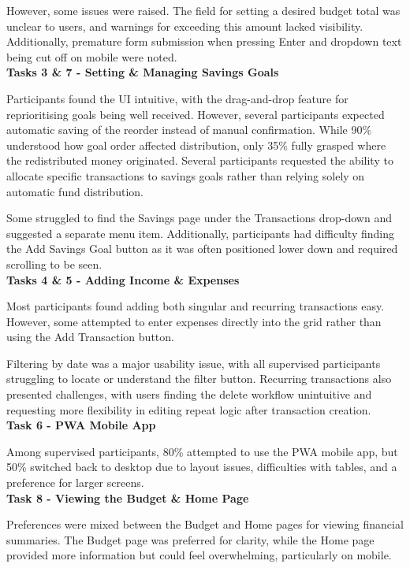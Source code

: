 \documentclass{l4proj}
\begin{document}
However, some issues were raised. The field for setting a desired budget total was unclear to users, and warnings for exceeding this amount lacked visibility. Additionally, premature form submission when pressing Enter and dropdown text being cut off on mobile were noted. \\  

\textbf{Tasks 3 \& 7 - Setting \& Managing Savings Goals} 

Participants found the UI intuitive, with the drag-and-drop feature for reprioritising goals being well received. However, several participants expected automatic saving of the reorder instead of manual confirmation. While 90\% understood how goal order affected distribution, only 35\% fully grasped where the redistributed money originated. Several participants requested the ability to allocate specific transactions to savings goals rather than relying solely on automatic fund distribution.  

Some struggled to find the Savings page under the Transactions drop-down and suggested a separate menu item. Additionally, participants had difficulty finding the Add Savings Goal button as it was often positioned lower down and required scrolling to be seen.  \\ 

\textbf{Tasks 4 \& 5 - Adding Income \& Expenses}

Most participants found adding both singular and recurring transactions easy. However, some attempted to enter expenses directly into the grid rather than using the Add Transaction button.  

Filtering by date was a major usability issue, with all supervised participants struggling to locate or understand the filter button. Recurring transactions also presented challenges, with users finding the delete workflow unintuitive and requesting more flexibility in editing repeat logic after transaction creation. \\

\textbf{Task 6 - PWA Mobile App}

Among supervised participants, 80\% attempted to use the PWA mobile app, but 50\% switched back to desktop due to layout issues, difficulties with tables, and a preference for larger screens.  \\

\textbf{Task 8 - Viewing the Budget \& Home Page}

Preferences were mixed between the Budget and Home pages for viewing financial summaries. The Budget page was preferred for clarity, while the Home page provided more information but could feel overwhelming, particularly on mobile.  
\end{document}
